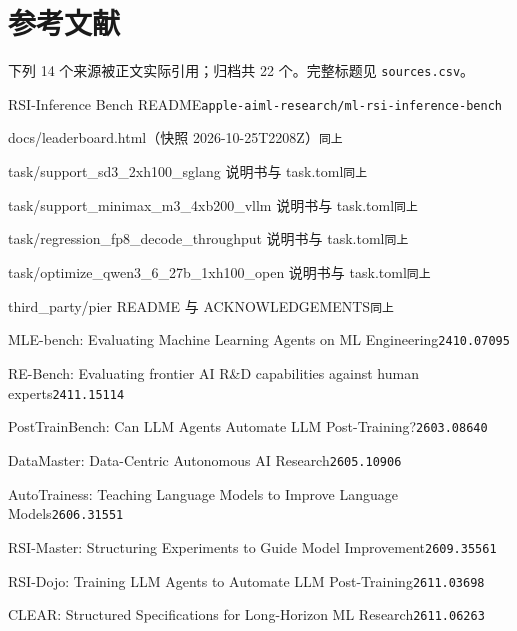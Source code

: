 \section*{参考文献}
\begingroup
\scriptsize
\setlength{\parindent}{0pt}
\setlength{\parskip}{1.4pt}
\begin{refs}
\noindent 下列 14 个来源被正文实际引用；归档共 22 个。完整标题见 \texttt{sources.csv}。\par
[1] RSI-Inference Bench README\hfill{\texttt{apple-aiml-research/ml-rsi-inference-bench}}\par
[2] docs/leaderboard.html（快照 2026-10-25T2208Z）\hfill{\texttt{同上}}\par
[3] task/support\_sd3\_2xh100\_sglang 说明书与 task.toml\hfill{\texttt{同上}}\par
[4] task/support\_minimax\_m3\_4xb200\_vllm 说明书与 task.toml\hfill{\texttt{同上}}\par
[5] task/regression\_fp8\_decode\_throughput 说明书与 task.toml\hfill{\texttt{同上}}\par
[6] task/optimize\_qwen3\_6\_27b\_1xh100\_open 说明书与 task.toml\hfill{\texttt{同上}}\par
[7] third\_party/pier README 与 ACKNOWLEDGEMENTS\hfill{\texttt{同上}}\par
[8] MLE-bench: Evaluating Machine Learning Agents on ML Engineering\hfill{\texttt{2410.07095}}\par
[9] RE-Bench: Evaluating frontier AI R\&D capabilities against human experts\hfill{\texttt{2411.15114}}\par
[10] PostTrainBench: Can LLM Agents Automate LLM Post-Training?\hfill{\texttt{2603.08640}}\par
[11] DataMaster: Data-Centric Autonomous AI Research\hfill{\texttt{2605.10906}}\par
[12] AutoTrainess: Teaching Language Models to Improve Language Models\hfill{\texttt{2606.31551}}\par
[13] RSI-Master: Structuring Experiments to Guide Model Improvement\hfill{\texttt{2609.35561}}\par
[14] RSI-Dojo: Training LLM Agents to Automate LLM Post-Training\hfill{\texttt{2611.03698}}\par
[15] CLEAR: Structured Specifications for Long-Horizon ML Research\hfill{\texttt{2611.06263}}\par
\end{refs}
